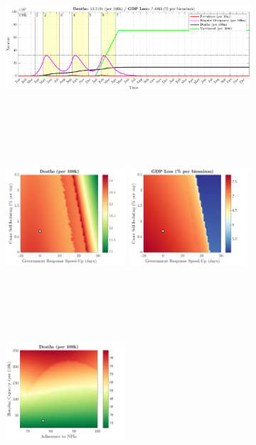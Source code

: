 \documentclass[paper=a4, fontsize=11pt]{scrartcl}
\numberwithin{figure}{section}
\numberwithin{table}{section}
\begin{document}
\begin{figure}[H]
\centering
    \begin{subfigure}[b]{\textwidth}
     	\includegraphics[width=\textwidth,height=5.5cm]{Counterfactuals/UK_sars}
    \end{subfigure}
    \begin{subfigure}[b]{\textwidth}
      	\includegraphics[width=0.49\textwidth,height=6cm]{UK/SARS/ero_d}
	\hspace{0.05cm}
    	\includegraphics[width=0.49\textwidth,height=6cm]{UK/SARS/ero_g}
    \end{subfigure}
    \begin{subfigure}[b]{\textwidth}
      	\includegraphics[width=0.49\textwidth,height=6cm]{UK/SARS/npl_d}

\end{subfigure}
\end{figure}
\end{document}
